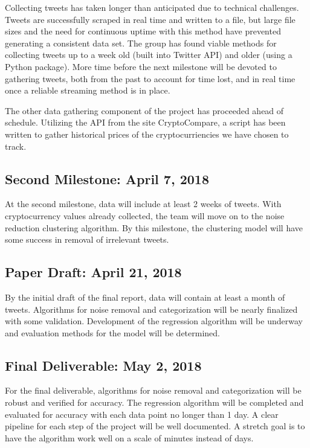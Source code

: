 \documentclass[sigconf]{acmart}
\begin{document}
Collecting tweets has taken longer than anticipated due to technical challenges. Tweets are successfully scraped in real time and written to a file, but large file sizes and the need for continuous uptime with this method have prevented generating a consistent data set. The group has found viable methods for collecting tweets up to a week old (built into Twitter API) and older (using a Python package). More time before the next milestone will be devoted to gathering tweets, both from the past to account for time lost, and in real time once a reliable streaming method is in place.

The other data gathering component of the project has proceeded ahead of schedule. Utilizing the API from the site CryptoCompare, a script has been written to gather historical prices of the cryptocurriencies we have chosen to track. 

\subsection{Second Milestone: April 7, 2018}

At the second milestone, data will include at least 2 weeks of
tweets. With cryptocurrency values already collected, the team will move on to the noise reduction clustering algorithm. By this milestone, the clustering model will have some success in removal of irrelevant tweets.

\subsection{Paper Draft: April 21, 2018}

By the initial draft of the final report, data will contain at least a month of tweets. Algorithms for noise removal and categorization will be nearly finalized with some validation. Development of the regression algorithm will be underway and evaluation methods for the model will be determined.

\subsection{Final Deliverable: May 2, 2018}

For the final deliverable, algorithms for noise removal and categorization will be robust and verified for accuracy. The regression algorithm will be completed and evaluated for accuracy with each data point no longer than 1 day. A clear pipeline for each step of the project will be well documented. A stretch goal is to have the algorithm work well on a scale of minutes instead of days.



\end{document}
